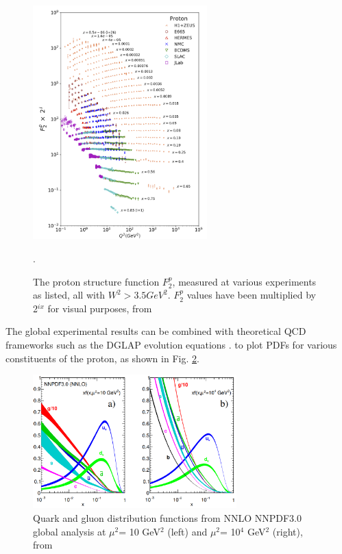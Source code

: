         
        \begin{figure}[H]
            \centering
            \includegraphics[width=0.6\textwidth]{Chapters/Ch1-Intro/Ch1-Sec1-Background/pics/inelastic-ep/protF2.png}
            \caption[Proton Structure Function $F^p_2$]{The proton structure function $F^p_2$, measured at various experiments as listed, all with $W^2>3.5 GeV^2$. $F^p_2$ values have been multiplied by 2$^{ix}$ for visual purposes, from \parencite{Zyla2020ReviewPhysics}}.
            \label{fig:HERA}
        \end{figure}

        The global experimental results can be combined with theoretical QCD frameworks such as the DGLAP evolution equations \parencite{Altarelli1977AsymptoticLanguage}. to plot PDFs for various constituents of the proton, as shown in Fig. \ref{fig:PDFPlots}. 
        
                \begin{figure}[H]
            \centering
            \includegraphics[width=0.7\textwidth]{Chapters/Ch1-Intro/Ch1-Sec1-Background/pics/inelastic-ep/partonPDFs.png}
            \caption[Parton Distribution Functions]{Quark and gluon distribution functions from NNLO NNPDF3.0 global analysis at $\mu^2$= 10 GeV$^2$ (left) and $\mu^2$= 10$^4$ GeV$^2$ (right),  from \parencite{Zyla2020ReviewPhysics}}
            \label{fig:PDFPlots}
        \end{figure}

